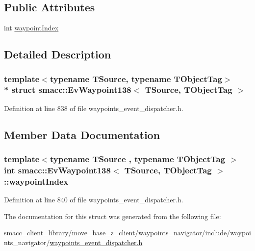 \subsection*{Public Attributes}
\begin{DoxyCompactItemize}
\item 
int \hyperlink{structsmacc_1_1EvWaypoint138_a8b28b4fc53dafa0d4daf0468ee3534ed}{waypoint\+Index}
\end{DoxyCompactItemize}


\subsection{Detailed Description}
\subsubsection*{template$<$typename T\+Source, typename T\+Object\+Tag$>$\\*
struct smacc\+::\+Ev\+Waypoint138$<$ T\+Source, T\+Object\+Tag $>$}



Definition at line 838 of file waypoints\+\_\+event\+\_\+dispatcher.\+h.



\subsection{Member Data Documentation}
\subsubsection[{\texorpdfstring{waypoint\+Index}{waypointIndex}}]{\setlength{\rightskip}{0pt plus 5cm}template$<$typename T\+Source , typename T\+Object\+Tag $>$ int {\bf smacc\+::\+Ev\+Waypoint138}$<$ T\+Source, T\+Object\+Tag $>$\+::waypoint\+Index}\hypertarget{structsmacc_1_1EvWaypoint138_a8b28b4fc53dafa0d4daf0468ee3534ed}{}\label{structsmacc_1_1EvWaypoint138_a8b28b4fc53dafa0d4daf0468ee3534ed}


Definition at line 840 of file waypoints\+\_\+event\+\_\+dispatcher.\+h.



The documentation for this struct was generated from the following file\+:\begin{DoxyCompactItemize}
\item 
smacc\+\_\+client\+\_\+library/move\+\_\+base\+\_\+z\+\_\+client/waypoints\+\_\+navigator/include/waypoints\+\_\+navigator/\hyperlink{waypoints__event__dispatcher_8h}{waypoints\+\_\+event\+\_\+dispatcher.\+h}\end{DoxyCompactItemize}

